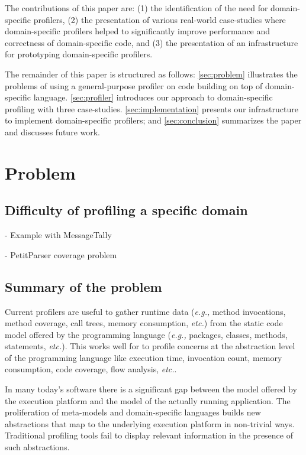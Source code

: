 \documentclass[runningheads]{llncs}
\newcommand{\eg}{\emph{e.g.,}\xspace}
\newcommand{\etc}{\emph{etc.}\xspace}
\newcommand{\seclabel}[1]{\label{sec:#1}}
\begin{document}
The contributions of this paper are: (1) the identification of the need for domain-specific profilers, (2) the presentation of various real-world case-studies where domain-specific profilers helped to significantly improve performance and correctness of domain-specific code, and (3) the presentation of an infrastructure for prototyping domain-specific profilers.

The remainder of this paper is structured as follows: \autoref{sec:problem} illustrates the problems of using a general-purpose profiler on code building on top of domain-specific language. \autoref{sec:profiler} introduces our approach to domain-specific profiling with three case-studies. \autoref{sec:implementation} presents our infrastructure to implement domain-specific profilers; and \autoref{sec:conclusion} summarizes the paper and discusses future work.

\section{Problem}\seclabel{problem}

\subsection{Difficulty of profiling a specific domain}

- Example with MessageTally

- PetitParser coverage problem

\subsection{Summary of the problem}

Current profilers are useful to gather runtime data (\eg method invocations, method coverage, call trees, memory consumption, \etc) from the static code model offered by the programming language (\eg packages, classes, methods, statements, \etc). This works well for to profile concerns at the abstraction level of the programming language like execution time, invocation count, memory consumption, code coverage, flow analysis, \etc.

In many today's software there is a significant gap between the model offered by the execution platform and the model of the actually running application. The proliferation of meta-models and domain-specific languages builds new abstractions that map to the underlying execution platform in non-trivial ways. Traditional profiling tools fail to display relevant information in the presence of such abstractions.
\end{document}
